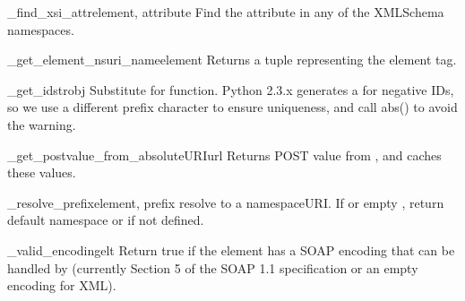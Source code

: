 \begin{funcdesc}{_find_xsi_attr}{element, attribute}
Find the attribute in any of the XMLSchema namespaces.
\end{funcdesc}

\begin{funcdesc}{_get_element_nsuri_name}{element}
Returns a  tuple representing the element tag.
\end{funcdesc}

\begin{funcdesc}{_get_idstr}{obj}
Substitute for  function.  Python 2.3.x generates a  for negative
IDs, so we use a different prefix character to ensure uniqueness, and call abs()
to avoid the warning.
\end{funcdesc}

\begin{funcdesc}{_get_postvalue_from_absoluteURI}{url}
Returns POST value from , and caches these values. 
\end{funcdesc}

\begin{funcdesc}{_resolve_prefix}{element, prefix}
 resolve  to a namespaceURI.  If  or empty ,
 return default namespace or  if not defined.
\end{funcdesc}

\begin{funcdesc}{_valid_encoding}{elt}
Return true if the element  has a SOAP encoding
that can be handled by \ZSI{}
(currently Section 5 of the SOAP 1.1 specification or an empty encoding
for XML).
\end{funcdesc}